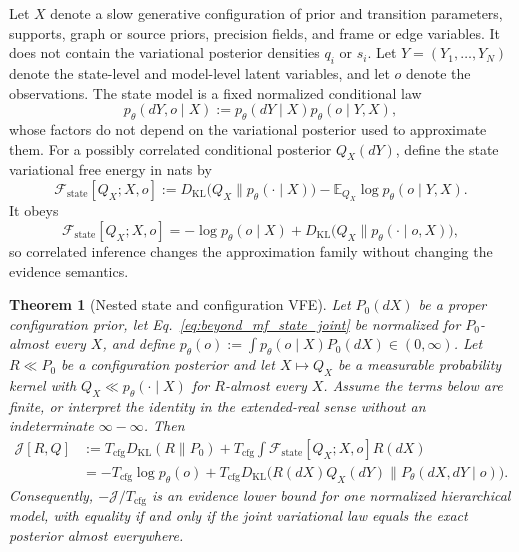\documentclass[11pt]{article}
\newtheorem{theorem}{Theorem}
\begin{document}
Let $X$ denote a slow generative configuration of prior and transition parameters, supports, graph or source priors, precision fields, and frame or edge variables. It does not contain the variational posterior densities $q_i$ or $s_i$. Let $Y=(Y_1,\ldots,Y_N)$ denote the state-level and model-level latent variables, and let $o$ denote the observations. The state model is a fixed normalized conditional law
\begin{equation}
p_\theta(dY,o\mid X)
:=p_\theta(dY\mid X)p_\theta(o\mid Y,X),
\label{eq:beyond_mf_state_joint}
\end{equation}
whose factors do not depend on the variational posterior used to approximate them. For a possibly correlated conditional posterior $Q_X(dY)$, define the state variational free energy in nats by
\begin{equation}
\mathcal{F}_{\mathrm{state}}[Q_X;X,o]
:=D_{\mathrm{KL}}\bigl(Q_X\|p_\theta(\cdot\mid X)\bigr)
-\mathbb{E}_{Q_X}\log p_\theta(o\mid Y,X).
\label{eq:beyond_mf_state_vfe}
\end{equation}
It obeys
\begin{equation}
\mathcal{F}_{\mathrm{state}}[Q_X;X,o]
=-\log p_\theta(o\mid X)
+D_{\mathrm{KL}}\bigl(Q_X\|p_\theta(\cdot\mid o,X)\bigr),
\label{eq:beyond_mf_state_elbo_identity}
\end{equation}
so correlated inference changes the approximation family without changing the evidence semantics.

\begin{theorem}[Nested state and configuration VFE]
\label{thm:nested_state_configuration_vfe}
Let $P_0(dX)$ be a proper configuration prior, let Eq.~\eqref{eq:beyond_mf_state_joint} be normalized for $P_0$-almost every $X$, and define $p_\theta(o):=\int p_\theta(o\mid X)P_0(dX)\in(0,\infty)$. Let $R\ll P_0$ be a configuration posterior and let $X\mapsto Q_X$ be a measurable probability kernel with $Q_X\ll p_\theta(\cdot\mid X)$ for $R$-almost every $X$. Assume the terms below are finite, or interpret the identity in the extended-real sense without an indeterminate $\infty-\infty$. Then
\begin{align}
\mathcal{J}[R,Q]
&:=T_{\mathrm{cfg}}D_{\mathrm{KL}}(R\|P_0)
+T_{\mathrm{cfg}}\int
\mathcal{F}_{\mathrm{state}}[Q_X;X,o]R(dX)
\nonumber\\
&=-T_{\mathrm{cfg}}\log p_\theta(o)
+T_{\mathrm{cfg}}D_{\mathrm{KL}}
\bigl(R(dX)Q_X(dY)\|P_\theta(dX,dY\mid o)\bigr).
\label{eq:nested_state_configuration_identity}
\end{align}
Consequently, $-\mathcal{J}/T_{\mathrm{cfg}}$ is an evidence lower bound for one normalized hierarchical model, with equality if and only if the joint variational law equals the exact posterior almost everywhere.
\end{theorem}
\end{document}
